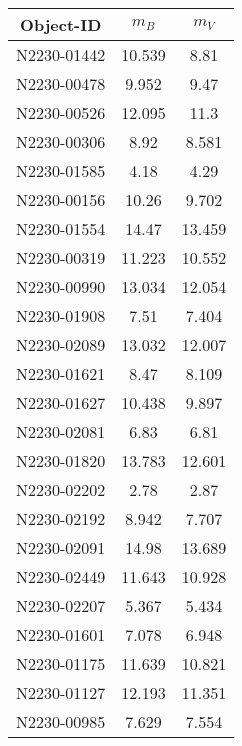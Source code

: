 \begin{table}[H]
	\centering
	\begin{tabular}{ c  c  c }
		\\\hline
		\centering
			Object-ID & $m_B$ & $m_V$ \\\hline
			N2230-01442 & 10.539 & 8.81 \\
			N2230-00478 & 9.952 & 9.47 \\
			N2230-00526 & 12.095 & 11.3 \\
			N2230-00306 & 8.92 & 8.581 \\
			N2230-01585 & 4.18 & 4.29 \\
			N2230-00156 & 10.26 & 9.702 \\
			N2230-01554 & 14.47 & 13.459 \\
			N2230-00319 & 11.223 & 10.552 \\
			N2230-00990 & 13.034 & 12.054 \\
			N2230-01908 & 7.51 & 7.404 \\
			N2230-02089 & 13.032 & 12.007 \\
			N2230-01621 & 8.47 & 8.109 \\
			N2230-01627 & 10.438 & 9.897 \\
			N2230-02081 & 6.83 & 6.81 \\
			N2230-01820 & 13.783 & 12.601 \\
			N2230-02202 & 2.78 & 2.87 \\
			N2230-02192 & 8.942 & 7.707 \\
			N2230-02091 & 14.98 & 13.689 \\
			N2230-02449 & 11.643 & 10.928 \\
			N2230-02207 & 5.367 & 5.434 \\
			N2230-01601 & 7.078 & 6.948 \\
			N2230-01175 & 11.639 & 10.821 \\
			N2230-01127 & 12.193 & 11.351 \\
			N2230-00985 & 7.629 & 7.554 \\\hline
	\end{tabular}
	\caption{\label{Tab:}}
\end{table}
